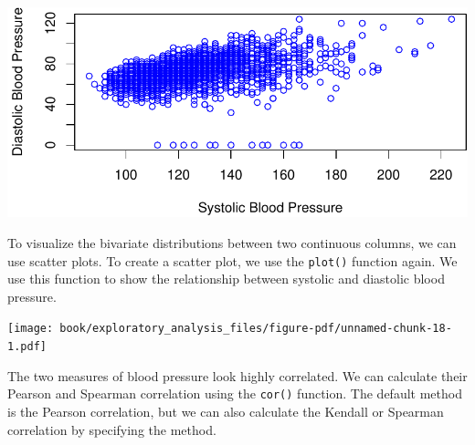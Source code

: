 \documentclass[
  letterpaper,
]{latex/krantz}
\makeatletter
\newenvironment{Shaded}{\begin{snugshade}}{\end{snugshade}}
\newcommand{\AttributeTok}[1]{\textcolor[rgb]{0.40,0.45,0.13}{#1}}
\newcommand{\CommentTok}[1]{\textcolor[rgb]{0.37,0.37,0.37}{#1}}
\newcommand{\FunctionTok}[1]{\textcolor[rgb]{0.28,0.35,0.67}{#1}}
\newcommand{\NormalTok}[1]{\textcolor[rgb]{0.00,0.23,0.31}{#1}}
\newcommand{\SpecialCharTok}[1]{\textcolor[rgb]{0.37,0.37,0.37}{#1}}
\newcommand{\StringTok}[1]{\textcolor[rgb]{0.13,0.47,0.30}{#1}}
\newenvironment{kframe}{%
\medskip{}
\setlength{\fboxsep}{.8em}
 \def\at@end@of@kframe{}%
 \ifinner\ifhmode%
  \def\at@end@of@kframe{\end{minipage}}%
  \begin{minipage}{\columnwidth}%
 \fi\fi%
 \def\FrameCommand##1{\hskip\@totalleftmargin \hskip-\fboxsep
 \colorbox{shadecolor}{##1}\hskip-\fboxsep
     \hskip-\linewidth \hskip-\@totalleftmargin \hskip\columnwidth}%
 \MakeFramed {\advance\hsize-\width
   \@totalleftmargin\z@ \linewidth\hsize
   \@setminipage}}%
 {\par\unskip\endMakeFramed%
 \at@end@of@kframe}
\renewenvironment{Shaded}{\begin{kframe}}{\end{kframe}}
\makeatother
\begin{document}
\begin{center}
\includegraphics[width=1\textwidth,height=\textheight]{book/exploratory_analysis_files/figure-pdf/unnamed-chunk-17-1.pdf}
\end{center}

To visualize the bivariate distributions between two continuous columns,
we can use scatter plots. To create a scatter
plot, we use the
\texttt{plot()} function
again. We use this function to show the relationship between systolic
and diastolic blood pressure.

\begin{Shaded}
\end{Shaded}

\begin{center}
\texttt{[image: book/exploratory\_analysis\_files/figure-pdf/unnamed-chunk-18-1.pdf]}
\end{center}

The two measures of blood pressure look highly correlated. We can
calculate their Pearson and Spearman correlation using the
\texttt{cor()} function. The
default method is the Pearson correlation, but we can also calculate the
Kendall or Spearman correlation by specifying the method.

\begin{Shaded}
\end{Shaded}
\end{document}
